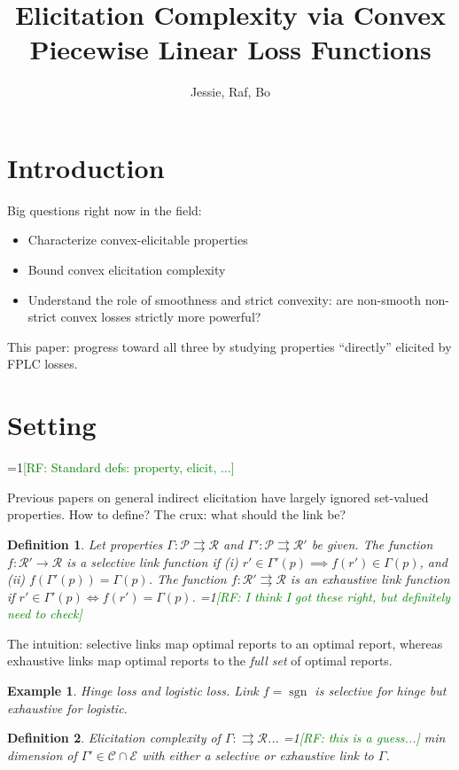 \documentclass[11pt]{article}
\title{Elicitation Complexity via Convex Piecewise Linear Loss Functions}
\author{Jessie, Raf, Bo}
\newcommand{\Comments}{1}
\newcommand{\mynote}[2]{\ifnum\Comments=1\textcolor{#1}{#2}\fi}
\newcommand{\raf}[1]{\mynote{green}{[RF: #1]}}
\renewcommand{\P}{\mathcal{P}}
\newcommand{\R}{\mathcal{R}}
\newcommand{\toto}{\rightrightarrows}
\DeclareMathOperator*{\sgn}{sgn}
\newtheorem{definition}{Definition}
\newtheorem{example}{Example}
\begin{document}
\maketitle

\section{Introduction}
Big questions right now in the field:
\begin{itemize}
\item Characterize convex-elicitable properties
\item Bound convex elicitation complexity
\item Understand the role of smoothness and strict convexity: are non-smooth non-strict convex losses strictly more powerful?
\end{itemize}

This paper: progress toward all three by studying properties ``directly'' elicited by FPLC losses.

\section{Setting}

\raf{Standard defs: property, elicit, ...}

Previous papers on general indirect elicitation have largely ignored set-valued properties.
How to define?
The crux: what should the link be?

\begin{definition}
  Let properties $\Gamma:\P\toto\R$ and $\Gamma':\P\toto\R'$ be given.
  The function $f:\R'\to\R$ is a \emph{selective link function} if (i) $r'\in\Gamma'(p) \implies f(r') \in \Gamma(p)$, and (ii) $f(\Gamma'(p)) = \Gamma(p)$.
  The function $f:\R'\toto\R$ is an \emph{exhaustive link function} if $r'\in\Gamma'(p) \iff f(r') = \Gamma(p)$.
  \raf{I think I got these right, but definitely need to check}
\end{definition}

The intuition: selective links map optimal reports to an optimal report, whereas exhaustive links map optimal reports to the \emph{full set} of optimal reports.

\begin{example}
  Hinge loss and logistic loss.
  Link $f = \sgn$ is selective for hinge but exhaustive for logistic.
\end{example}

\begin{definition}
  Elicitation complexity of $\Gamma:\toto\R$... \raf{this is a guess...} min dimension of $\Gamma'\in\mathcal{C}\cap\mathcal{E}$ with either a selective or exhaustive link to $\Gamma$.
\end{definition}
\end{document}
